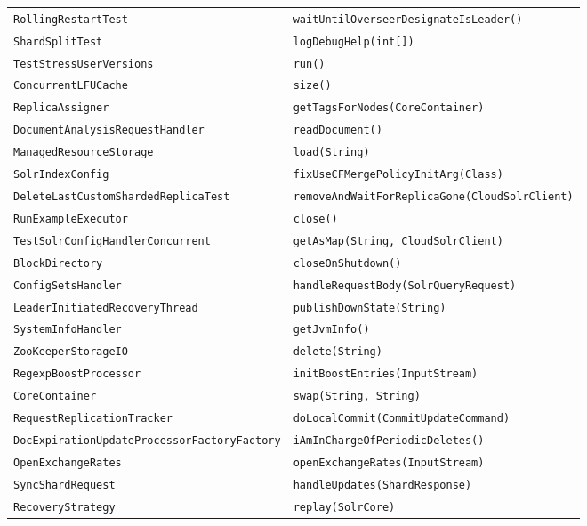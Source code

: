 \begin{center}
\begin{longtable}{ll}
\lstinline/RollingRestartTest/&{\lstinline/waitUntilOverseerDesignateIsLeader()/}\\
\lstinline/ShardSplitTest/&{\lstinline/logDebugHelp(int[])/}\\
\lstinline/TestStressUserVersions/&{\lstinline/run()/}\\
\lstinline/ConcurrentLFUCache/&{\lstinline/size()/}\\
\lstinline/ReplicaAssigner/&{\lstinline/getTagsForNodes(CoreContainer)/}\\
\lstinline/DocumentAnalysisRequestHandler/&{\lstinline/readDocument()/}\\
\lstinline/ManagedResourceStorage/&{\lstinline/load(String)/}\\
\lstinline/SolrIndexConfig/&{\lstinline/fixUseCFMergePolicyInitArg(Class)/}\\
\lstinline/DeleteLastCustomShardedReplicaTest/&{\lstinline/removeAndWaitForReplicaGone(CloudSolrClient)/}\\
\lstinline/RunExampleExecutor/&{\lstinline/close()/}\\
\lstinline/TestSolrConfigHandlerConcurrent/&{\lstinline/getAsMap(String, CloudSolrClient)/}\\
\lstinline/BlockDirectory/&{\lstinline/closeOnShutdown()/}\\
\lstinline/ConfigSetsHandler/&{\lstinline/handleRequestBody(SolrQueryRequest)/}\\
\lstinline/LeaderInitiatedRecoveryThread/&{\lstinline/publishDownState(String)/}\\
\lstinline/SystemInfoHandler/&{\lstinline/getJvmInfo()/}\\
\lstinline/ZooKeeperStorageIO/&{\lstinline/delete(String)/}\\
\lstinline/RegexpBoostProcessor/&{\lstinline/initBoostEntries(InputStream)/}\\
\lstinline/CoreContainer/&{\lstinline/swap(String, String)/}\\
\lstinline/RequestReplicationTracker/&{\lstinline/doLocalCommit(CommitUpdateCommand)/}\\
\lstinline/DocExpirationUpdateProcessorFactoryFactory/&{\lstinline/iAmInChargeOfPeriodicDeletes()/}\\
\lstinline/OpenExchangeRates/&{\lstinline/openExchangeRates(InputStream)/}\\
\lstinline/SyncShardRequest/&{\lstinline/handleUpdates(ShardResponse)/}\\
\lstinline/RecoveryStrategy/&{\lstinline/replay(SolrCore)/}\\

\end{longtable}
\end{center}
